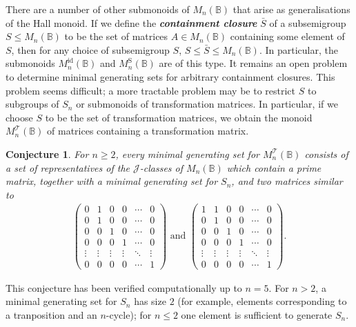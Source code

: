 \documentclass[11pt]{article}
\newtheorem*{conj}{Conjecture}
\newcommand{\defn}[1]{\textbf{\textit{#1}}}
\numberwithin{equation}{section}
\newcommand{\B}{\mathbb{B}}
\newcommand{\Bn}{M_n(\B)}
\newcommand{\Refln}{M_n^{\text{id}}(\B)}
\newcommand{\Halln}{M_n^{\text{S}}(\B)}
\newcommand{\MTn}{M_n^{\mathcal{T}}(\B)}
\newcommand{\J}{\mathscr{J}}
\begin{document}
There are a number of other submonoids of $\Bn$ that arise as generalisations of
the Hall monoid. If we define the \defn{containment closure} $\bar{S}$ of a
subsemigroup $S \leq \Bn$ to be the set of matrices $A \in \Bn$ containing some
element of $S$, then for any choice of subsemigroup $S$, $S \leq \bar{S} \leq
\Bn$. In particular, the submonoids $\Refln$ and $\Halln$ are of this
type. It remains an open problem to determine minimal generating sets for
arbitrary containment closures. This problem seems difficult; a more tractable
problem may be to restrict $S$ to subgroups of $S_n$ or submonoids of
transformation matrices. In particular, if we choose $S$ to be the set of
transformation matrices, we obtain the monoid $\MTn$ of matrices containing a
transformation matrix.

\begin{conj}
  For $n \geq 2$, every minimal generating set for $\MTn$ consists of a set of
  representatives of the $\J$-classes of $\Bn$ which contain a prime matrix,
  together with a minimal generating set for $S_n$, and two matrices similar to
  \begin{align*}
  \begin{pmatrix}
    0 & 1 & 0 & 0 & \cdots & 0 \\
    0 & 1 & 0 & 0 & \cdots & 0 \\
    0 & 0 & 1 & 0 & \cdots & 0 \\
    0 & 0 & 0 & 1 & \cdots & 0 \\
    \vdots  & \vdots & \vdots & \vdots & \ddots & \vdots\\
    0 & 0 & 0 & 0 & \cdots & 1
  \end{pmatrix}\text{ and } 
  \begin{pmatrix}
    1 & 1 & 0 & 0 & \cdots & 0 \\
    0 & 1 & 0 & 0 & \cdots & 0 \\
    0 & 0 & 1 & 0 & \cdots & 0 \\
    0 & 0 & 0 & 1 & \cdots & 0 \\
    \vdots  & \vdots & \vdots & \vdots & \ddots & \vdots\\
    0 & 0 & 0 & 0 & \cdots & 1
  \end{pmatrix}.
  \end{align*}
\end{conj}
This conjecture has been verified computationally up to $n = 5$. For $n > 2$,
a minimal generating set for $S_n$ has size $2$ (for example, elements
corresponding to a tranposition and an $n$-cycle); for $n \leq 2$ one element is
sufficient to generate $S_n$.
\end{document}
